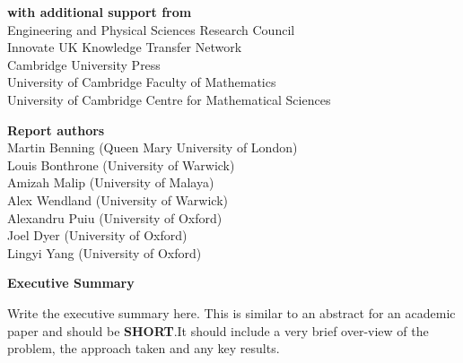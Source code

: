 \documentclass[12pt]{article}
\begin{document}
\begin{center}
\textbf{with additional support from}\\
Engineering and Physical Sciences Research Council\\
Innovate UK Knowledge Transfer Network\\
Cambridge University Press\\
University of Cambridge Faculty of Mathematics\\
University of Cambridge Centre for Mathematical Sciences
\end{center}
\newpage
\begin{center}
    \large\textbf{Report authors}\\ %
   \vskip1cm
    \normalsize Martin Benning (Queen Mary University of London) \\
    \normalsize Louis Bonthrone (University of Warwick)\\
    \normalsize Amizah Malip (University of Malaya)\\
    \normalsize Alex Wendland (University of Warwick)\\
    \normalsize Alexandru Puiu (University of Oxford)\\
    \normalsize Joel Dyer (University of Oxford)\\
    \normalsize Lingyi Yang (University of Oxford)
\end{center}
\vskip2cm
\begin{center}
    \textbf{Executive Summary}
\end{center}
Write the executive summary here. This is similar to an abstract for an academic paper and should be \textbf{SHORT}.It should include a very brief over-view of the problem, the approach taken and any key results.
\newpage
\end{document}
